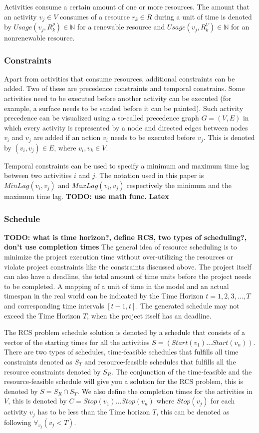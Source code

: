 \documentclass{article}
\newcommand{\TODO}[1]{{\color{red}\textbf{TODO: #1}}}
\begin{document}
Activities consume a certain amount of one or more resources.
The amount that an activity $v_j \in V$ consumes of a resource $r_k \in R$ during a unit of time is denoted by $Usage(v_j, R^{\rho}_k) \in \mathbb{N}$ for a renewable resource and   $Usage(v_j, R^V_k) \in \mathbb{N}$ for an nonrenewable resource.


\subsubsection{Constraints}
Apart from activities that consume resources, additional constraints can be added.
Two of these are precedence constraints and temporal constrains.
Some activities need to be executed before another activity can be executed (for example, a surface needs to be sanded before it can be painted).
Such activity precedence can be visualized using a so-called precedence graph $G = (V, E)$ in which every activity is represented by a node and directed edges between nodes $v_i$ and $v_j$ are added if an action $v_i$ needs to be executed before $v_j$.
This is denoted by $(v_i,v_j) \in E$, where $v_i, v_k \in V$.

Temporal constraints can be used to specify a minimum and maximum time lag between two activities $i$ and $j$.
The notation used in this paper is $MinLag(v_i, v_j)$ and $MaxLag(v_i, v_j)$ respectively the minimum and the maximum time lag.
\TODO{use math func. Latex}

\subsubsection{Schedule}
\TODO{what is time horizon?, define RCS, two types of scheduling?, don't use completion times}
The general idea of resource scheduling is to minimize the project execution time without over-utilizing the resources or violate project constraints like the constraints discussed above.
The project itself can also have a deadline, the total amount of time units before the project needs to be completed.
A mapping of a unit of time in the model and an actual timespan in the real world can be indicated by the Time Horizon $t=1,2,3,\ldots,T$ and corresponding time intervals $[t-1,t]$.
The generated schedule may not exceed the Time Horizon $T$, when the project itself has an deadline.

The RCS problem schedule solution is denoted by a schedule that consists of a vector of the starting times for all the activities $S =  (Start(v_1) \ldots Start(v_n))$.
There are two types of schedules, time-feasible schedules that fulfills all time constraints denoted as $S_T$ and resource-feasible schedules that fulfills all the resource constraints denoted by $S_R$.
The conjunction of the time-feasible and the resource-feasible schedule will give you a solution for the RCS problem, this is denoted by $S = S_R \cap S_T$.
We also define the completion times for the activities in $V$, this is denoted by $C = Stop(v_1) \ldots Stop(v_n)$ where $Stop(v_j)$ for each activity $v_j$ has to be less than the Time horizon $T$, this can be denoted as following $\forall_{v_j}(v_j < T)$.
\end{document}
